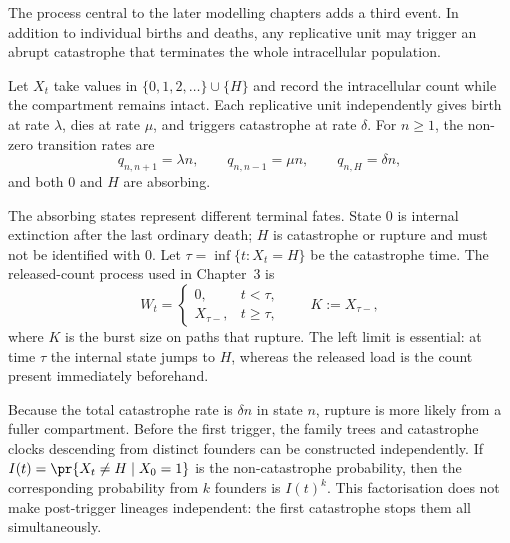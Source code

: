 The process central to the later modelling chapters adds a third event. In
addition to individual births and deaths, any replicative unit may trigger an
abrupt catastrophe that terminates the whole intracellular population.

\begin{definition}
\label{m:def:bdc}
Let $X_t$ take values in $\{0,1,2,\ldots\}\cup\{H\}$ and record the
intracellular count while the compartment remains intact. Each replicative
unit independently gives birth at rate $\lambda$, dies at rate $\mu$, and
triggers catastrophe at rate $\delta$. For $n\ge1$, the non-zero transition
rates are
\begin{equation}
\label{m:eq:bdcrates}
q_{n,n+1}=\lambda n,
\qquad
q_{n,n-1}=\mu n,
\qquad
q_{n,H}=\delta n,
\end{equation}
and both $0$ and $H$ are absorbing.
\end{definition}

The absorbing states represent different terminal fates. State $0$ is
internal extinction after the last ordinary death; $H$ is catastrophe or
rupture and must not be identified with $0$. Let
$\tau=\inf\{t:X_t=H\}$ be the catastrophe time. The released-count process
used in Chapter~3 is
\begin{equation}
\label{m:eq:bdcrelease}
W_t=
\begin{cases}
0,&t<\tau,\\
X_{\tau-},&t\ge\tau,
\end{cases}
\qquad
K:=X_{\tau-},
\end{equation}
where $K$ is the burst size on paths that rupture. The left limit is essential:
at time $\tau$ the internal state jumps to $H$, whereas the released load is
the count present immediately beforehand.

Because the total catastrophe rate is $\delta n$ in state $n$, rupture is more
likely from a fuller compartment. Before the first trigger, the family trees
and catastrophe clocks descending from distinct founders can be constructed
independently. If
$I(t)=\pr{X_t\ne H\mid X_0=1}$ is the non-catastrophe probability, then the
corresponding probability from $k$ founders is $I(t)^k$. This factorisation
does not make post-trigger lineages independent: the first catastrophe stops
them all simultaneously.

